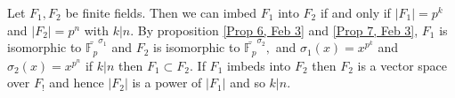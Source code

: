 \begin{cor} \label{Cor 8, Feb 3}
Let $F_1,F_2$ be finite fields. Then we can imbed $F_1$ into $F_2$ if and only if $|F_1|=p^k$ and $|F_2|=p^n$ with $k|n$. By proposition \ref{Prop 6, Feb 3} and \ref{Prop 7, Feb 3}, $F_1$ is isomorphic to $\bar{\mathbb{F}_p}^{\sigma_1}$ and $F_2$ is isomorphic to $\bar{\mathbb{F}_p}^{\sigma_2},$ and $\sigma_1(x)=x^{p^k}$ and $\sigma_2(x)=x^{p^n}$ if $k|n$ then $F_1\subset F_2$. If $F_1$ imbeds into $F_2$ then $F_2$ is a vector space over $F_!$ and hence $|F_2|$ is a power of $|F_1|$ and so $k|n$.
\end{cor}
